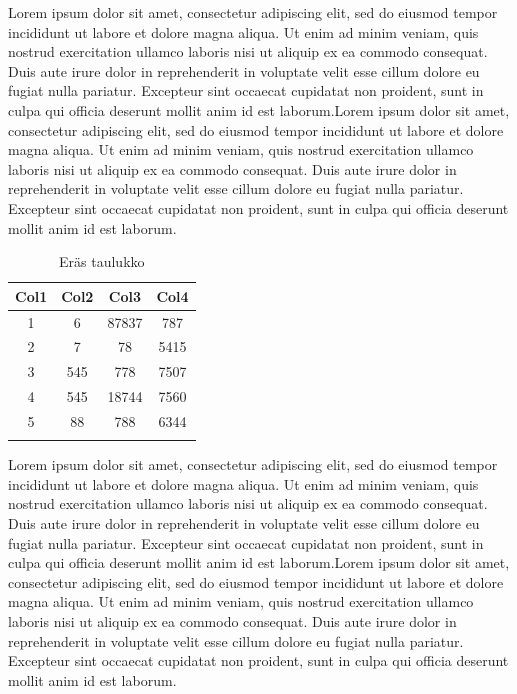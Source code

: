 \documentclass[a4paper,12pt]{article}
\begin{document}

Lorem ipsum dolor sit amet, consectetur adipiscing elit, sed do eiusmod tempor incididunt ut labore et dolore magna aliqua. Ut enim ad minim veniam, quis nostrud exercitation ullamco laboris nisi ut aliquip ex ea commodo consequat. Duis aute irure dolor in reprehenderit in voluptate velit esse cillum dolore eu fugiat nulla pariatur. Excepteur sint occaecat cupidatat non proident, sunt in culpa qui officia deserunt mollit anim id est laborum.Lorem ipsum dolor sit amet, consectetur adipiscing elit, sed do eiusmod tempor incididunt ut labore et dolore magna aliqua. Ut enim ad minim veniam, quis nostrud exercitation ullamco laboris nisi ut aliquip ex ea commodo consequat. Duis aute irure dolor in reprehenderit in voluptate velit esse cillum dolore eu fugiat nulla pariatur. Excepteur sint occaecat cupidatat non proident, sunt in culpa qui officia deserunt mollit anim id est laborum.

\begin{table}[h]
\centering
\caption{Eräs taulukko}
\begin{tabular}{c c c c} 
\toprule
\textbf{Col1}&\textbf{Col2}&\textbf{Col3}&\textbf{Col4}\\
\midrule
 1 & 6 & 87837 & 787 \\ 
 2 & 7 & 78 & 5415 \\
 3 & 545 & 778 & 7507 \\
 4 & 545 & 18744 & 7560 \\
 5 & 88 & 788 & 6344 \\ [1ex] 
\bottomrule
\label{tab:erastaulukko}
\end{tabular}
\end{table}

Lorem ipsum dolor sit amet, consectetur adipiscing elit, sed do eiusmod tempor incididunt ut labore et dolore magna aliqua. Ut enim ad minim veniam, quis nostrud exercitation ullamco laboris nisi ut aliquip ex ea commodo consequat. Duis aute irure dolor in reprehenderit in voluptate velit esse cillum dolore eu fugiat nulla pariatur. Excepteur sint occaecat cupidatat non proident, sunt in culpa qui officia deserunt mollit anim id est laborum.Lorem ipsum dolor sit amet, consectetur adipiscing elit, sed do eiusmod tempor incididunt ut labore et dolore magna aliqua. Ut enim ad minim veniam, quis nostrud exercitation ullamco laboris nisi ut aliquip ex ea commodo consequat. Duis aute irure dolor in reprehenderit in voluptate velit esse cillum dolore eu fugiat nulla pariatur. Excepteur sint occaecat cupidatat non proident, sunt in culpa qui officia deserunt mollit anim id est laborum.

\newpage

\end{document}
